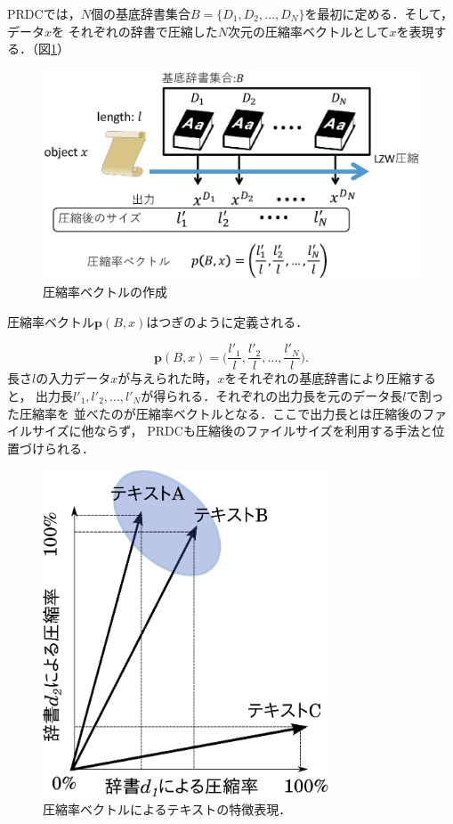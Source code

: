 PRDCでは，$N$個の基底辞書集合$B=\{D_1,D_2,\dots,D_N\}$を最初に定める．そして，データ$x$を
それぞれの辞書で圧縮した$N$次元の圧縮率ベクトルとして$x$を表現する．（図\ref{fig:PRDC.eps}）
\begin{figure}[tb]
\centering
\includegraphics[clip, width=\columnwidth]{image/PRDC.eps}
\caption{圧縮率ベクトルの作成}
\label{fig:PRDC.eps}
\end{figure}

圧縮率ベクトル$\boldsymbol{p}(B,x)$はつぎのように定義される．

\begin{equation}
\boldsymbol{p}(B,x) = \biggl(\frac{l'_1}{l}, \frac{l'_2}{l},\dots,\frac{l'_N}{l} \biggr).
\label{eq:PRDC}
\end{equation}
長さ$l$の入力データ$x$が与えられた時，$x$をそれぞれの基底辞書により圧縮すると，
出力長$l'_1,l'_2,\dots,l'_N$が得られる．それぞれの出力長を元のデータ長$l$で割った圧縮率を
並べたのが圧縮率ベクトルとなる．ここで出力長とは圧縮後のファイルサイズに他ならず，
PRDCも圧縮後のファイルサイズを利用する手法と位置づけられる．

\begin{figure}[tb]
\begin{center}
\includegraphics[width=8.5cm]{image/cv.eps}
\end{center}
\caption{圧縮率ベクトルによるテキストの特徴表現．}
\label{cv}
\end{figure}

